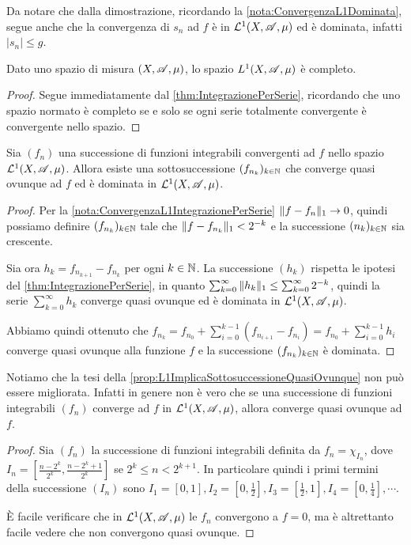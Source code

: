 \begin{remark}\label{nota:ConvergenzaL1IntegrazionePerSerie}
	Da notare che dalla dimostrazione, ricordando la \cref{nota:ConvergenzaL1Dominata}, segue anche che la convergenza di $s_n$ ad $f$ è in $\mathcal L^1(X,\mathscr A,\mu)$ ed è dominata, infatti $|s_n|\le g$.
\end{remark}


\begin{corollary}
	Dato uno spazio di misura $(X,\mathscr A,\mu)$, lo spazio $L^1(X,\mathscr A,\mu)$ è completo.
\end{corollary}

\begin{proof}
	Segue immediatamente dal \cref{thm:IntegrazionePerSerie}, ricordando che uno spazio normato è completo se e solo se ogni serie totalmente convergente è convergente nello spazio.
\end{proof}

\begin{proposition}\label{prop:L1ImplicaSottosuccessioneQuasiOvunque}
	Sia $(f_n)$ una successione di funzioni integrabili convergenti ad $f$ nello spazio $\mathcal L^1(X,\mathscr A,\mu)$. Allora esiste una sottosuccessione $(f_{n_k})_{k\in\mathbb N}$ che converge quasi ovunque ad $f$ ed è dominata in $\mathcal L^1(X,\mathscr A,\mu)$.
\end{proposition}

\begin{proof}
	Per la \cref{nota:ConvergenzaL1IntegrazionePerSerie} $\Vert f-f_n\Vert_1\to 0$, quindi possiamo definire $(f_{n_k})_{k\in\mathbb N}$ tale che $\Vert f-f_{n_k}\Vert_1<2^{-k}$ e la successione $(n_k)_{k\in\mathbb N}$ sia crescente.
	
	Sia ora $h_k=f_{n_{k+1}}-f_{n_k}$ per ogni $k\in\mathbb N$. La successione $(h_k)$ rispetta le ipotesi del \cref{thm:IntegrazionePerSerie}, in quanto $\sum_{k=0}^\infty \Vert h_k\Vert_1\le \sum_{k=0}^\infty 2^{-k}$, quindi la serie $\sum_{k=0}^\infty h_k$ converge quasi ovunque ed è dominata in $\mathcal L^1(X,\mathscr A,\mu)$.
	
	Abbiamo quindi ottenuto che $f_{n_k}=f_{n_0}+\sum_{i=0}^{k-1}(f_{n_{i+1}}-f_{n_i})=f_{n_0}+\sum_{i=0}^{k-1} h_i$ converge quasi ovunque alla funzione $f$ e la successione $(f_{n_k})_{k\in\mathbb N}$ è dominata.
\end{proof}

\begin{remark}
	Notiamo che la tesi della \cref{prop:L1ImplicaSottosuccessioneQuasiOvunque} non può essere migliorata. Infatti in genere non è vero che se una successione di funzioni integrabili $(f_n)$ converge ad $f$ in $\mathcal L^1(X,\mathscr A,\mu)$, allora converge quasi ovunque ad $f$.
\end{remark}
\begin{proof}
	Sia $(f_n)$ la successione di funzioni integrabili definita da $f_n=\chi_{I_n}$, dove $I_n=\left[\frac{n-2^k}{2^k},\frac{n-2^k+1}{2^k}\right]$ se $2^k\le n<2^{k+1}$. In particolare quindi i primi termini della successione $(I_n)$ sono $I_1=\left[0,1\right],I_2=\left[0,\frac 12\right],I_3=\left[\frac 12,1\right],I_4=\left[0,\frac 14\right],\cdots$. 
	
	È facile verificare che in $\mathcal L^1(X,\mathscr A,\mu)$ le $f_n$ convergono a $f=0$, ma è altrettanto facile vedere che non convergono quasi ovunque.
\end{proof}

